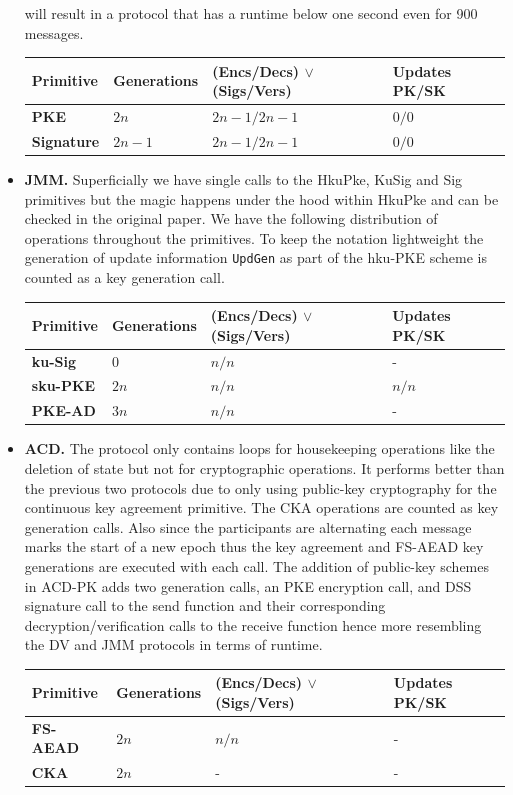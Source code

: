 \documentclass[11pt,a4paper,twoside,openright,bibliography=totoc]{scrbook}
\begin{document}
\begin{itemize}
  will result in a protocol that has a runtime below one second
  even for 900 messages.
  \begin{center}
    \begin{tabular}{ | l | l | l | l |}
    \hline
    Primitive & Generations & (Encs/Decs) $\vee$ (Sigs/Vers) & Updates PK/SK \\ \hline
    \textbf{PKE} & $2n$ & $2n-1/2n-1$ & $0/0$ \\ \hline
    \textbf{Signature} & $2n-1$ & $2n-1/2n-1$ & $0/0$ \\  
    \hline
    \end{tabular}
  \end{center}
\item \textbf{JMM.} Superficially we have single calls to the HkuPke, KuSig and
  Sig primitives but the magic happens under the hood within HkuPke and can
  be checked in the original paper. We have the following distribution
  of operations throughout the primitives. To keep the notation lightweight
  the generation of update information \texttt{UpdGen} as part
  of the hku-PKE scheme is counted as a key generation call.
  \begin{center}
    \begin{tabular}{ | l | l | l | l |}
    \hline
    Primitive & Generations & (Encs/Decs) $\vee$ (Sigs/Vers) & Updates PK/SK \\ \hline
    \textbf{ku-Sig} & $0$ & $n/n$ & - \\ \hline
    \textbf{sku-PKE} & $2n$ & $n/n$ & $n/n$ \\ \hline
    \textbf{PKE-AD} & $3n$ & $n/n$ & - \\
    \hline
    \end{tabular}
  \end{center}
\item \textbf{ACD.} The protocol only contains loops for housekeeping operations
  like the deletion of state but not for cryptographic operations. It performs
  better than the previous two protocols due to only using public-key cryptography
  for the continuous key agreement primitive. The CKA operations are counted
  as key generation calls. Also since the participants are alternating
  each message marks the start of a new epoch thus the key agreement and
  FS-AEAD key generations are executed with each call. The addition
  of public-key schemes in ACD-PK adds two generation calls, an PKE encryption call,
  and DSS signature call to the send function and their corresponding
  decryption/verification calls to the receive function hence more
  resembling the DV and JMM protocols in terms of runtime.
  \begin{center}
    \begin{tabular}{ | l | l | l | l |}
    \hline
    Primitive & Generations & (Encs/Decs) $\vee$ (Sigs/Vers) & Updates PK/SK \\ \hline
    \textbf{FS-AEAD} & $2n$ & $n/n$ & - \\ \hline
    \textbf{CKA} & $2n$ & - & - \\  
    \hline
    \end{tabular}
  \end{center}
\end{itemize}
\end{document}
